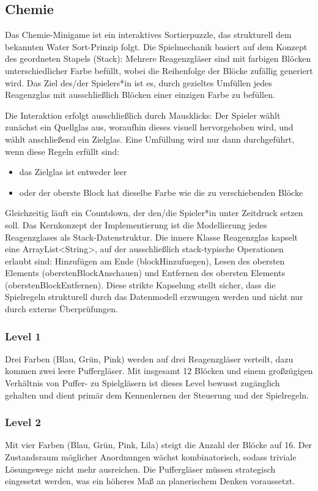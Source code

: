 \subsection{Chemie}
Das Chemie-Minigame ist ein interaktives Sortierpuzzle, das strukturell dem bekannten \glqq{}Water Sort\grqq{}-Prinzip folgt. Die Spielmechanik basiert auf dem Konzept des geordneten Stapels (Stack): Mehrere Reagenzgläser sind mit farbigen Blöcken unterschiedlicher Farbe befüllt, wobei die Reihenfolge der Blöcke zufällig generiert wird. Das Ziel des/der Spielers*in ist es, durch gezieltes Umfüllen jedes Reagenzglas mit ausschließlich Blöcken einer einzigen Farbe zu befüllen.

Die Interaktion erfolgt ausschließlich durch Mausklicks: Der Spieler wählt zunächst ein \glqq{}Quellglas\grqq{} aus, woraufhin dieses visuell hervorgehoben wird, und wählt anschließend ein Zielglas. Eine Umfüllung wird nur dann durchgeführt, wenn diese Regeln erfüllt sind:
\begin{itemize}
\item das Zielglas ist entweder leer
\item oder der oberste Block hat dieselbe Farbe wie die zu verschiebenden Blöcke
\end{itemize}

Gleichzeitig läuft ein Countdown, der den/die Spieler*in unter Zeitdruck setzen soll.
Das Kernkonzept der Implementierung ist die Modellierung jedes Reagenzglases als Stack-Datenstruktur. Die innere Klasse Reagenzglas kapselt eine ArrayList<String>, auf der ausschließlich stack-typische Operationen erlaubt sind: Hinzufügen am Ende (blockHinzufuegen), Lesen des obersten Elements (oberstenBlockAnschauen) und Entfernen des obersten Elements (oberstenBlockEntfernen).
Diese strikte Kapselung stellt sicher, dass die Spielregeln strukturell durch das Datenmodell erzwungen werden und nicht nur durch externe Überprüfungen.


\subsubsection{Level 1}

Drei Farben (Blau, Grün, Pink) werden auf drei Reagenzgläser verteilt, dazu kommen zwei leere Puffergläser. Mit insgesamt 12 Blöcken und einem großzügigen Verhältnis von Puffer- zu Spielgläsern ist dieses Level bewusst zugänglich gehalten und dient primär dem Kennenlernen der Steuerung und der Spielregeln.

\subsubsection{Level 2}
Mit vier Farben (Blau, Grün, Pink, Lila) steigt die Anzahl der Blöcke auf 16. Der Zustandsraum möglicher Anordnungen wächst kombinatorisch, sodass triviale Lösungswege nicht mehr ausreichen. Die Puffergläser müssen strategisch eingesetzt werden, was ein höheres Maß an planerischem Denken voraussetzt.

